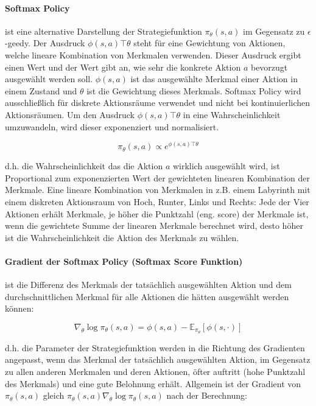 \documentclass[conference]{IEEEtran}
\begin{document}
\paragraph*{Softmax Policy} ist eine alternative Darstellung der Strategiefunktion $\pi_\theta(s,a)$ im Gegensatz zu $\epsilon$-geedy. Der Ausdruck $\phi(s,a) \top \theta$ steht für eine Gewichtung von Aktionen, welche lineare Kombination von Merkmalen verwenden. Dieser Ausdruck ergibt einen Wert und der Wert gibt an, wie sehr die konkrete Aktion $a$ bevorzugt ausgewählt werden soll.  $\phi(s,a)$ ist das ausgewählte Merkmal einer Aktion in einem Zustand und $\theta$ ist die Gewichtung dieses Merkmals. Softmax Policy wird ausschließlich für diskrete Aktionsräume verwendet und nicht bei kontinuierlichen Aktionsräumen. Um den Ausdruck $\phi(s,a) \top \theta$ in eine Wahrscheinlichkeit umzuwandeln, wird dieser exponenziert und normalisiert.

\begin{equation*}
\pi_\theta(s,a) \propto e^{\phi(s,a) \top \theta}
\end{equation*}

d.h. die Wahrscheinlichkeit das die Aktion $a$ wirklich ausgewählt wird, ist Proportional zum exponenzierten Wert der gewichteten linearen Kombination der Merkmale. Eine lineare Kombination von Merkmalen in z.B. einem Labyrinth mit einem diskreten Aktionsraum von Hoch, Runter, Links und Rechts: Jede der Vier Aktionen erhält Merkmale, je höher die Punktzahl (eng. score) der Merkmale ist, wenn die gewichtete Summe der linearen Merkmale berechnet wird, desto höher ist die Wahrscheinlichkeit die Aktion des Merkmals zu wählen.

\paragraph*{Gradient der Softmax Policy (Softmax Score Funktion)} ist die Differenz des Merkmals der tatsächlich ausgewählten Aktion und dem durchschnittlichen Merkmal für alle Aktionen die hätten ausgewählt werden können: 

\begin{equation*}
\nabla_\theta \log \pi_\theta (s,a) = \phi(s,a) - \mathbb{E}_{\pi_\theta}[\phi(s, \cdot)]
\end{equation*}

d.h. die Parameter der Strategiefunktion werden in die Richtung des Gradienten angepasst, wenn das Merkmal der tatsächlich ausgewählten Aktion, im Gegensatz zu allen anderen Merkmalen und deren Aktionen, öfter auftritt (hohe Punktzahl des Merkmals) und eine gute Belohnung erhält. Allgemein ist der Gradient von $\pi_\theta (s,a)$ gleich $\pi_\theta (s,a) \nabla_\theta \log \pi_\theta (s,a)$ nach der Berechnung:
\end{document}
